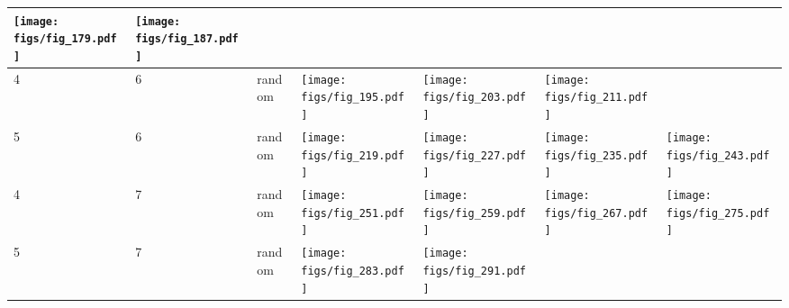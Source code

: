 \documentclass[oneside,canadian,landscape]{article}
\begin{document}
\begin{center}
\begin{longtable}{|l|l|l||l|l|l|l|}
\begin{minipage}{3.5cm}
\texttt{[image: figs/fig\_179.pdf]}
\end{minipage}
&\begin{minipage}{3.5cm}
\texttt{[image: figs/fig\_187.pdf]}
\end{minipage}
&\\ \hline
4&6&random&\begin{minipage}{3.5cm}
\texttt{[image: figs/fig\_195.pdf]}
\end{minipage}
&\begin{minipage}{3.5cm}
\texttt{[image: figs/fig\_203.pdf]}
\end{minipage}
&\begin{minipage}{3.5cm}
\texttt{[image: figs/fig\_211.pdf]}
\end{minipage}
&\\ \hline
5&6&random&\begin{minipage}{3.5cm}
\texttt{[image: figs/fig\_219.pdf]}
\end{minipage}
&\begin{minipage}{3.5cm}
\texttt{[image: figs/fig\_227.pdf]}
\end{minipage}
&\begin{minipage}{3.5cm}
\texttt{[image: figs/fig\_235.pdf]}
\end{minipage}
&\begin{minipage}{3.5cm}
\texttt{[image: figs/fig\_243.pdf]}
\end{minipage}
\\ \hline
4&7&random&\begin{minipage}{3.5cm}
\texttt{[image: figs/fig\_251.pdf]}
\end{minipage}
&\begin{minipage}{3.5cm}
\texttt{[image: figs/fig\_259.pdf]}
\end{minipage}
&\begin{minipage}{3.5cm}
\texttt{[image: figs/fig\_267.pdf]}
\end{minipage}
&\begin{minipage}{3.5cm}
\texttt{[image: figs/fig\_275.pdf]}
\end{minipage}
\\ \hline
5&7&random&\begin{minipage}{3.5cm}
\texttt{[image: figs/fig\_283.pdf]}
\end{minipage}
&\begin{minipage}{3.5cm}
\texttt{[image: figs/fig\_291.pdf]}

\end{minipage}
\end{longtable}
\end{center}
\end{document}
